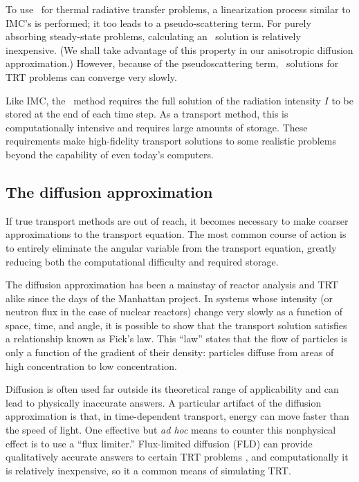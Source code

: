 To use \SN\ for thermal radiative transfer problems, a linearization process
similar to IMC's is performed; it too leads to a pseudo-scattering term.
For purely absorbing steady-state problems, calculating an \SN\ solution is
relatively inexpensive. (We shall take advantage of this property in our
anisotropic diffusion approximation.) However, because of the pseudoscattering
term, \SN\ solutions for TRT problems can converge very slowly.

Like IMC, the \SN\ method requires the full solution of the radiation intensity
$I$ to be stored at the end of each time step. As a transport method, this is
computationally intensive and requires large amounts of storage. These
requirements make high-fidelity transport solutions to some realistic problems
beyond the capability of even today's computers.

\subsection{The diffusion approximation}
If true transport methods are out of reach, it becomes necessary to make
coarser approximations to the transport equation.
The most common course of action is to entirely eliminate the angular variable
from the transport equation, greatly reducing both the computational difficulty
and required storage.

The diffusion approximation has been a mainstay of reactor analysis and TRT
alike since the days of the Manhattan project. In systems whose intensity (or
neutron flux
in the case of nuclear reactors) change very slowly as a function of space, time, and
angle, it is possible to show \cite{Lar1975,Lar1983a} that the transport
solution satisfies a relationship known as Fick's law. This ``law'' states that
the flow of particles is only a function of the gradient of their density:
particles diffuse from areas of high concentration to low concentration.

Diffusion is often used far outside its theoretical range of applicability and
can lead to physically inaccurate answers. A particular artifact of the
diffusion approximation is that, in time-dependent transport, energy can
move faster than the speed of light. One effective but \emph{ad hoc} means to
counter this nonphysical effect is to use a ``flux limiter.''
Flux-limited diffusion (FLD) can provide qualitatively accurate answers to
certain TRT problems \cite{Ols2000}, and computationally it is relatively
inexpensive, so it a common means of simulating TRT.

